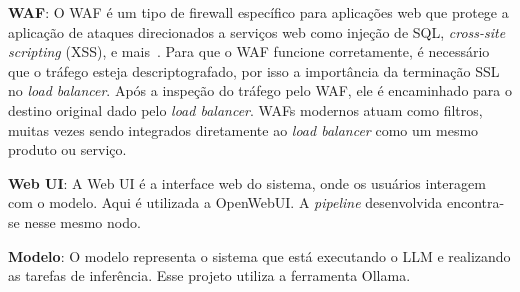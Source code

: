 \documentclass[journal]{IEEEtran}
\begin{document}
\noindent\textbf{WAF\@}:
O WAF é um tipo de firewall específico para aplicações web que protege a aplicação de ataques direcionados a serviços web como injeção de SQL, \textit{cross-site scripting} (XSS), e mais~\cite{cloudflarewaf}.
Para que o WAF funcione corretamente, é necessário que o tráfego esteja descriptografado, por isso a importância da terminação SSL no \textit{load balancer}.
Após a inspeção do tráfego pelo WAF, ele é encaminhado para o destino original dado pelo \textit{load balancer}.
WAFs modernos atuam como filtros, muitas vezes sendo integrados diretamente ao \textit{load balancer} como um mesmo produto ou serviço.

\noindent\textbf{Web UI\@}:
A Web UI é a interface web do sistema, onde os usuários interagem com o modelo.
Aqui é utilizada a OpenWebUI\@.
A \textit{pipeline} desenvolvida encontra-se nesse mesmo nodo.

\noindent\textbf{Modelo}:
O modelo representa o sistema que está executando o LLM e realizando as tarefas de inferência.
Esse projeto utiliza a ferramenta Ollama.
\end{document}
